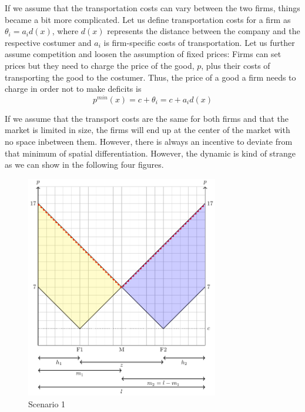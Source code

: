 \documentclass[
  12pt,
  oneside]{book}
\theoremstyle{definition}
\theoremstyle{definition}
\theoremstyle{definition}
\theoremstyle{definition}
\theoremstyle{remark}
\begin{document}
If we assume that the transportation costs can vary between the two firms, things became a bit more complicated. Let us define transportation costs for a firm as \(\theta_i=a_i d(x)\), where \(d(x)\) represents the distance between the company and the respective costumer and \(a_i\) is firm-specific costs of transportation. Let us further assume competition and loosen the assumption of fixed prices: Firms can set prices but they need to charge the price of the good, \(p\), plus their costs of transporting the good to the costumer. Thus, the price of a good a firm needs to charge in order not to make deficits is
\[
p^{min}(x)=c+\theta_i=c+a_i d(x)
\]

If we assume that the transport costs are the same for both firms and that the market is limited in size, the firms will end up at the center of the market with no space inbetween them. However, there is always an incentive to deviate from that minimum of spatial differentiation. However, the dynamic is kind of strange as we can show in the following four figures.

\begin{figure}
\centering
\includegraphics[width=0.75\textwidth,height=\textheight]{fig/lau1.png}
\caption{\label{fig:lau1} Scenario 1}
\end{figure}
\end{document}
